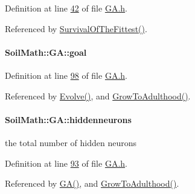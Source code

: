 Definition at line \hyperlink{_g_a_8h_source_l00042}{42} of file \hyperlink{_g_a_8h_source}{G\+A.\+h}.



Referenced by \hyperlink{_g_a_8cpp_source_l00189}{Survival\+Of\+The\+Fittest()}.

\hypertarget{class_soil_math_1_1_g_a_a4366c8f0852e8ec2bf37b3d5324b57cb}{}
\paragraph[{goal}]{ Soil\+Math\+::\+G\+A\+::goal\hspace{0.3cm}{\ttfamily [private]}}\label{class_soil_math_1_1_g_a_a4366c8f0852e8ec2bf37b3d5324b57cb}


Definition at line \hyperlink{_g_a_8h_source_l00098}{98} of file \hyperlink{_g_a_8h_source}{G\+A.\+h}.



Referenced by \hyperlink{_g_a_8cpp_source_l00023}{Evolve()}, and \hyperlink{_g_a_8cpp_source_l00152}{Grow\+To\+Adulthood()}.

\hypertarget{class_soil_math_1_1_g_a_a3f1eee7492f68a05b9b06ee8afb2ec20}{}
\paragraph[{hiddenneurons}]{ Soil\+Math\+::\+G\+A\+::hiddenneurons\hspace{0.3cm}{\ttfamily [private]}}\label{class_soil_math_1_1_g_a_a3f1eee7492f68a05b9b06ee8afb2ec20}
the total number of hidden neurons 

Definition at line \hyperlink{_g_a_8h_source_l00093}{93} of file \hyperlink{_g_a_8h_source}{G\+A.\+h}.



Referenced by \hyperlink{_g_a_8cpp_source_l00013}{G\+A()}, and \hyperlink{_g_a_8cpp_source_l00152}{Grow\+To\+Adulthood()}.

\hypertarget{class_soil_math_1_1_g_a_ac32591e30dde5ac854ae57a7b9e33298}{}
